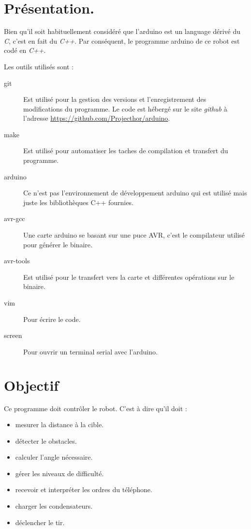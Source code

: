 
\section{Présentation.}
Bien qu'il soit habituellement considéré que l'arduino est un language dérivé du \emph{C}, c'est en fait du \emph{C++}. Par conséquent, le programme arduino de ce robot est codé en \emph{C++}.

Les outils utilisés sont :
\begin{description}
	\item[git] Est utilisé pour la gestion des versions et l'enregistrement des modifications du programme. Le code est hébergé sur le site \emph{github} à l'adresse \url{https://github.com/Projecthor/arduino}.
	\item[make] Est utilisé pour automatiser les taches de compilation et transfert du programme.
	\item[arduino] Ce n'est pas l'environnement de développement arduino qui est utilisé mais juste les bibliothèques C++ fournies.
	\item[avr-gcc] Une carte arduino se basant sur une puce AVR, c'est le compilateur utilisé pour générer le binaire.
	\item[avr-tools] Est utilisé pour le transfert vers la carte et différentes opérations sur le binaire.
	\item[vim] Pour écrire le code.
	\item[screen] Pour ouvrir un terminal serial avec l'arduino.
\end{description}

\section{Objectif}
Ce programme doit contrôler le robot. C'est à dire qu'il doit :\begin{itemize}
	\item mesurer la distance à la cible.
	\item détecter le obstacles.
	\item calculer l'angle nécessaire.
	\item gérer les niveaux de difficulté.
	\item recevoir et interpréter les ordres du téléphone.
	\item charger les condensateurs.
	\item déclencher le tir.
\end{itemize}

